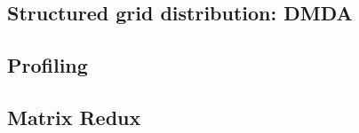 \documentclass{beamer}
\begin{document}
\subsection{Structured grid distribution: DMDA}













\subsection{Profiling}





\subsection{Matrix Redux}







\end{document}
